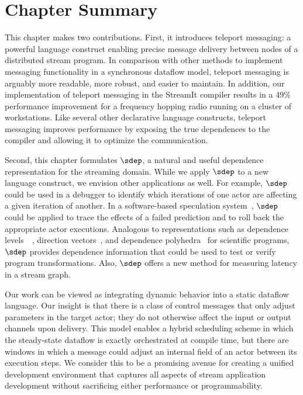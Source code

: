 \section{Chapter Summary}

This chapter makes two contributions.  First, it introduces teleport
messaging: a powerful language construct enabling precise message
delivery between nodes of a distributed stream program.  In comparison
with other methods to implement messaging functionality in a
synchronous dataflow model, teleport messaging is arguably more
readable, more robust, and easier to maintain.  In addition, our
implementation of teleport messaging in the StreamIt compiler results
in a 49\% performance improvement for a frequency hopping radio
running on a cluster of workstations.  Like several other declarative
language constructs, teleport messaging improves performance by
exposing the true dependences to the compiler and allowing it to
optimize the communication.


Second, this chapter formulates $\sdep$, a natural and useful
dependence representation for the streaming domain.  While we apply
$\sdep$ to a new language construct, we envision other applications as
well.  For example, $\sdep$ could be used in a debugger to identify
which iterations of one actor are affecting a given iteration of
another.  In a software-based speculation system~\cite{frank-thesis},
$\sdep$ could be applied to trace the effects of a failed prediction
and to roll back the appropriate actor executions.  Analogous to
representations such as dependence levels~~\cite{AK82}, direction
vectors~\cite{wolfe82}, and dependence polyhedra~\cite{Irig88} for
scientific programs, $\sdep$ provides dependence information that
could be used to test or verify program transformations.  Also,
$\sdep$ offers a new method for measuring latency in a stream graph.

Our work can be viewed as integrating dynamic behavior into a static
dataflow language.  Our insight is that there is a class of control
messages that only adjust parameters in the target actor; they do not
otherwise affect the input or output channels upon delivery.  This
model enables a hybrid scheduling scheme in which the steady-state
dataflow is exactly orchestrated at compile time, but there are
windows in which a message could adjust an internal field of an actor
between its execution steps.  We consider this to be a promising
avenue for creating a unified development environment that captures
all aspects of stream application development without sacrificing
either performance or programmability.
